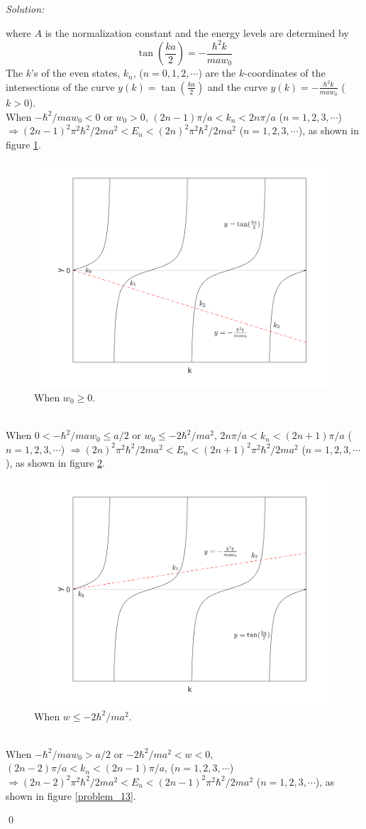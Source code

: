 \documentclass[10pt,a4paper]{article}
\newenvironment{sol}
    {\emph{Solution:}
    }
    {
    \qed
    }
\begin{document}
\begin{sol}
\begin{itemize}
where $A$ is the normalization constant and the energy levels are determined by
\begin{equation}
\tan\left(\frac{ka}{2}\right)=-\frac{\hbar^2k}{maw_0}
\end{equation}
The $k$'s of the even states, $k_n$, ($n=0,1,2,\cdots$) are the $k$-coordinates of the intersections of the curve $y(k)=\tan\left(\frac{ka}{2}\right)$ and the curve $y(k)=-\frac{\hbar^2k}{maw_0}$ ($k>0$).\\
When $-\hbar^2/maw_0<0$ or $w_0>0$, $(2n-1)\pi/a<k_n<2n\pi/a$ ($n=1,2,3,\cdots$) $\Longrightarrow(2n-1)^2\pi^2\hbar^2/2ma^2<E_n<(2n)^2\pi^2\hbar^2/2ma^2$ ($n=1,2,3,\cdots$), as shown in figure \ref{problem_11}.
\begin{figure}[h]
\centering
\includegraphics[width=.5\textwidth]{problem_11.png}
\caption{When $w_0\geq0$.}\label{problem_11}
\end{figure}
\\When $0<-\hbar^2/maw_0\leq a/2$ or $w_0\leq-2\hbar^2/ma^2$, $2n\pi/a<k_n<(2n+1)\pi/a$ ($n=1,2,3,\cdots$) $\Longrightarrow(2n)^2\pi^2\hbar^2/2ma^2<E_n<(2n+1)^2\pi^2\hbar^2/2ma^2$ ($n=1,2,3,\cdots$), as shown in figure \ref{problem_12}.
\begin{figure}[h]
\centering
\includegraphics[width=.5\textwidth]{problem_12.png}
\caption{When $w\leq-2\hbar^2/ma^2$.}\label{problem_12}
\end{figure}
\\When $-\hbar^2/maw_0>a/2$ or $-2\hbar^2/ma^2<w<0$, $(2n-2)\pi/a<k_n<(2n-1)\pi/a$, ($n=1,2,3,\cdots$) $\Longrightarrow(2n-2)^2\pi^2\hbar^2/2ma^2<E_n<(2n-1)^2\pi^2\hbar^2/2ma^2$ ($n=1,2,3,\cdots$), as shown in figure \ref{problem_13}.

\end{itemize}
\end{sol}
\end{document}
